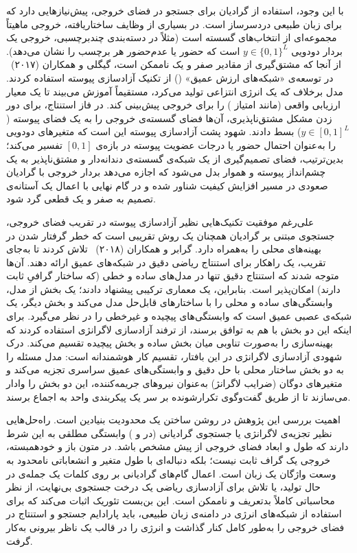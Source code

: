با این وجود، استفاده از گرادیان برای جستجو در فضای خروجی، پیش‌نیازهایی دارد که برای زبان طبیعی دردسرساز است. در بسیاری از وظایف ساختاریافته، خروجی ماهیتاً مجموعه‌ای از انتخاب‌های گسسته است (مثلاً در دسته‌بندی چندبرچسبی، خروجی یک بردار دودویی $y \in {\{0, 1\}}^L$ است که حضور یا عدم‌حضور هر برچسب را نشان می‌دهد). از آنجا که مشتق‌گیری از مقادیر صفر و یک ناممکن است، گیگلی و همکاران (۲۰۱۷)~\cite{gygli2017dvn} در توسعه‌ی «شبکه‌های ارزش عمیق» () از تکنیک آزادسازی پیوسته استفاده کردند. مدل  برخلاف  که یک انرژی انتزاعی تولید می‌کرد، مستقیماً آموزش می‌بیند تا یک معیار ارزیابی واقعی (مانند امتیاز ) را برای خروجی پیش‌بینی کند. در فاز استنتاج، برای دور زدن مشکل مشتق‌ناپذیری، آن‌ها فضای گسسته‌ی خروجی را به یک فضای پیوسته ($y \in {[0, 1]}^L$) بسط دادند. شهود پشت آزادسازی پیوسته این است که متغیرهای دودویی را به‌عنوان احتمال حضور یا درجات عضویت پیوسته در بازه‌ی $[0, 1]$ تفسیر می‌کند؛ بدین‌ترتیب، فضای تصمیم‌گیری از یک شبکه‌ی گسسته‌ی دندانه‌دار و مشتق‌ناپذیر به یک چشم‌انداز پیوسته و هموار بدل می‌شود که اجازه می‌دهد بردار خروجی با گرادیان صعودی در مسیر افزایش کیفیت شناور شده و در گام نهایی با اعمال یک آستانه‌ی تصمیم به صفر و یک قطعی گرد شود.

علی‌رغم موفقیت تکنیک‌هایی نظیر آزادسازی پیوسته در تقریب فضای خروجی، جستجوی مبتنی بر گرادیان همچنان یک روش تقریبی است که خطر گرفتار شدن در بهینه‌های محلی را به‌همراه دارد. گرابر و همکاران (۲۰۱۸)~\cite{graber2018deep} تلاش کردند تا به‌جای تقریب، یک راهکار برای استنتاج ریاضی دقیق در شبکه‌های عمیق ارائه دهند. آن‌ها متوجه شدند که استنتاج دقیق تنها در مدل‌های ساده و خطی (که ساختار گرافیِ ثابت دارند) امکان‌پذیر است. بنابراین، یک معماری ترکیبی پیشنهاد دادند؛ یک بخش از مدل، وابستگی‌های ساده و محلی را با ساختارهای قابل‌حل مدل می‌کند و بخش دیگر، یک شبکه‌ی عصبی عمیق است که وابستگی‌های پیچیده و غیرخطی را در نظر می‌گیرد. برای اینکه این دو بخش با هم به توافق برسند، از ترفند آزادسازی لاگرانژی استفاده کردند که بهینه‌سازی را به‌صورت تناوبی میان بخش ساده و بخش پیچیده تقسیم می‌کند. درک شهودی آزادسازی لاگرانژی در این بافتار، تقسیم کار هوشمندانه است: مدل مسئله را به دو بخش ساختار محلی با حل دقیق و وابستگی‌های عمیق سراسری تجزیه می‌کند و متغیرهای دوگان (ضرایب لاگرانژ) به‌عنوان نیروهای جریمه‌کننده، این دو بخش را وادار می‌سازند تا از طریق گفت‌وگوی تکرارشونده بر سر یک پیکربندی واحد به اجماع برسند.

اهمیت بررسی این پژوهش در روشن ساختن یک محدودیت بنیادین است. راه‌حل‌هایی نظیر تجزیه‌ی لاگرانژی یا جستجوی گرادیانی (در  و ) وابستگی مطلقی به این شرط دارند که طول و ابعاد فضای خروجی از پیش مشخص باشد. در متون باز و خودهمبسته، خروجی یک گراف ثابت نیست؛ بلکه دنباله‌ای با طول متغیر و انشعاباتی نامحدود به وسعت واژگان یک زبان است. اعمال گام‌های گرادیانی بر روی کلمات یک جمله‌ی در حال تولید، یا تلاش برای آزادسازی ریاضی یک درخت جستجوی بی‌نهایت، از نظر محاسباتی کاملاً بدتعریف و ناممکن است. این بن‌بست تئوریک اثبات می‌کند که برای استفاده از شبکه‌های انرژی در دامنه‌ی زبان طبیعی، باید پارادایم جستجو و استنتاج در فضای خروجی را به‌طور کامل کنار گذاشت و انرژی را در قالب یک ناظر بیرونی به‌کار گرفت.

